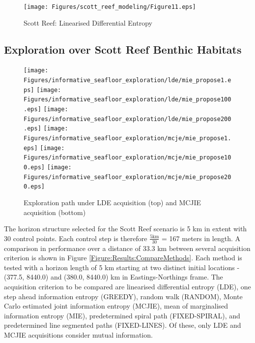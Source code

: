 \documentclass{article}
\begin{document}
		\begin{figure}[bp]
		\centering
			\texttt{[image: Figures/scott\_reef\_modeling/Figure11.eps]}
		\caption{Scott Reef: Linearised Differential Entropy}
		\label{Figure:Results:ScottReefLinearisedDifferentialEntropy}
		\end{figure}
	
			
	\subsection{Exploration over Scott Reef Benthic Habitats}
	
		\begin{figure}[t]
		\centering
			\texttt{[image: Figures/informative\_seafloor\_exploration/lde/mie\_propose1.eps]}
			\texttt{[image: Figures/informative\_seafloor\_exploration/lde/mie\_propose100.eps]}
			\texttt{[image: Figures/informative\_seafloor\_exploration/lde/mie\_propose200.eps]}
			\texttt{[image: Figures/informative\_seafloor\_exploration/mcje/mie\_propose1.eps]}
			\texttt{[image: Figures/informative\_seafloor\_exploration/mcje/mie\_propose100.eps]}
			\texttt{[image: Figures/informative\_seafloor\_exploration/mcje/mie\_propose200.eps]}	
		\caption{Exploration path under LDE acquisition (top) and MCJIE acquisition (bottom)}
		\label{Figure:Results:OptimalPaths}
		\end{figure}
		
		The horizon structure selected for the Scott Reef scenario is 5 km in extent with 30 control points. Each control step is therefore $\frac{5 \mathrm{km}}{30}$ = 167 meters in length.  A comparison in performance over a distance of 33.3 km between several acquisition criterion is shown in Figure \ref{Figure:Results:CompareMethods}. Each method is tested with a horizon length of 5 km starting at two distinct initial locations - (377.5, 8440.0) and (380.0, 8440.0) km in Eastings-Northings frame. The acquisition criterion to be compared are linearised differential entropy (LDE), one step ahead information entropy (GREEDY), random walk (RANDOM), Monte Carlo estimated joint information entropy (MCJIE), mean of marginalised information entropy (MIE), predetermined spiral path (FIXED-SPIRAL), and predetermined line segmented paths (FIXED-LINES). Of these, only LDE and MCJIE acquisitions consider mutual information.
\end{document}
